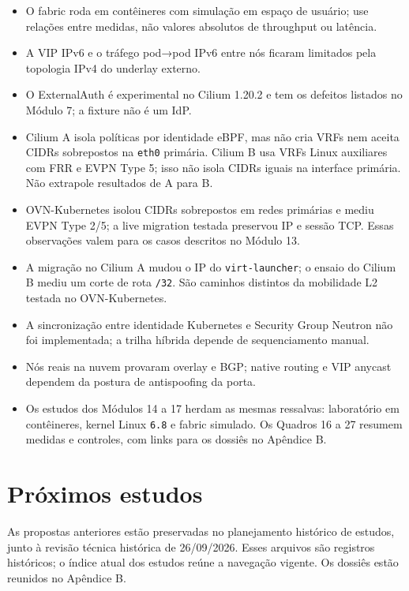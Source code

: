 \documentclass[12pt,openany,oneside,a4paper,chapter=TITLE,english,brazil]{abntex2}
\providecommand{\tightlist}{\setlength{\itemsep}{0pt}\setlength{\parskip}{0pt}}
\begin{document}
\begin{itemize}
\tightlist
\item
  O fabric roda em contêineres com simulação em espaço de usuário; use relações entre medidas, não valores absolutos de throughput ou latência.
\item
  A VIP IPv6 e o tráfego pod→pod IPv6 entre nós ficaram limitados pela topologia IPv4 do underlay externo.
\item
  O ExternalAuth é experimental no Cilium 1.20.2 e tem os defeitos listados no Módulo 7; a fixture não é um IdP.
\item
  Cilium A isola políticas por identidade eBPF, mas não cria VRFs nem aceita CIDRs sobrepostos na \texttt{eth0} primária. Cilium B usa VRFs Linux auxiliares com FRR e EVPN Type 5; isso não isola CIDRs iguais na interface primária. Não extrapole resultados de A para B.
\item
  OVN-Kubernetes isolou CIDRs sobrepostos em redes primárias e mediu EVPN Type 2/5; a live migration testada preservou IP e sessão TCP. Essas observações valem para os casos descritos no Módulo 13.
\item
  A migração no Cilium A mudou o IP do \texttt{virt-{}\allowbreak{}launcher}; o ensaio do Cilium B mediu um corte de rota \texttt{/\allowbreak{}32}. São caminhos distintos da mobilidade L2 testada no OVN-Kubernetes.
\item
  A sincronização entre identidade Kubernetes e Security Group Neutron não foi implementada; a trilha híbrida depende de sequenciamento manual.
\item
  Nós reais na nuvem provaram overlay e BGP; native routing e VIP anycast dependem da postura de antispoofing da porta.
\item
  Os estudos dos Módulos 14 a 17 herdam as mesmas ressalvas: laboratório em contêineres, kernel Linux \texttt{6.\allowbreak{}8} e fabric simulado. Os Quadros 16 a 27 resumem medidas e controles, com links para os dossiês no Apêndice B.
\end{itemize}

\section*{Próximos estudos}\label{pruxf3ximos-estudos}

As propostas anteriores estão preservadas no planejamento histórico de estudos, junto à revisão técnica histórica de 26/09/2026. Esses arquivos são registros históricos; o índice atual dos estudos reúne a navegação vigente. Os dossiês estão reunidos no Apêndice B.
\end{document}
